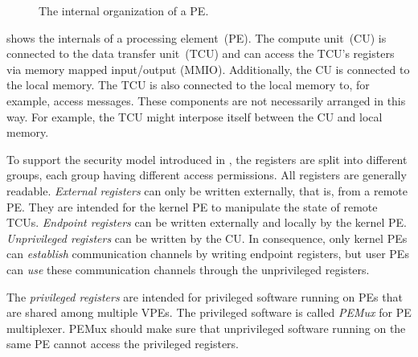 \begin{figure}[h]
  \caption{The internal organization of a PE.}
  \label{fig:peinternal}
\end{figure}

 shows the internals of a processing element~(PE). The compute unit~(CU) is
connected to the data transfer unit~(TCU) and can access the TCU's registers via memory mapped
input/output (MMIO). Additionally, the CU is connected to the local memory. The TCU is also
connected to the local memory to, for example, access messages. These components are not necessarily
arranged in this way. For example, the TCU might interpose itself between the CU and local memory.

To support the security model introduced in , the registers are split into
different groups, each group having different access permissions. All registers are generally
readable. \emph{External registers} can only be written externally, that is, from a remote PE. They
are intended for the kernel PE to manipulate the state of remote TCUs. \emph{Endpoint registers} can
be written externally and locally by the kernel PE. \emph{Unprivileged registers} can be written by
the CU. In consequence, only kernel PEs can \emph{establish} communication channels by writing
endpoint registers, but user PEs can \emph{use} these communication channels through the
unprivileged registers.

\cbstart The \emph{privileged registers} are intended for privileged software running on PEs that
are shared among multiple VPEs. The privileged software is called \emph{PEMux} for PE multiplexer.
PEMux should make sure that unprivileged software running on the same PE cannot access the
privileged registers. \cbend


